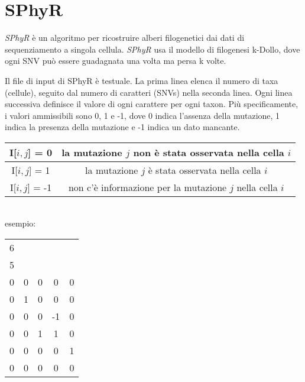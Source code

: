 \section{SPhyR}
\textit{SPhyR}\cite{sphyr} è un algoritmo per ricostruire alberi filogenetici dai dati di sequenziamento a singola cellula. \textit{SPhyR} usa il modello di filogenesi k-Dollo, dove ogni SNV può essere guadagnata una volta ma persa k volte.

Il file di input di SPhyR è testuale. La prima linea elenca il numero di taxa (cellule), seguito dal numero di caratteri (SNVs) nella seconda linea. Ogni linea successiva definisce il valore di ogni carattere per ogni taxon. Più specificamente, i valori ammissibili sono 0, 1 e -1, dove 0 indica l'assenza della mutazione, 1 indica la presenza della mutazione e -1 indica un dato mancante.
\begin{center}
\begin{tabular}{ | c | c | }
	\hline
	I[$i,j$] = 0 & la mutazione $j$ non è stata osservata nella cella $i$ \\
	\hline
	I[$i,j$] = 1 & la mutazione $j$ è stata osservata nella cella $i$ \\
	\hline
	I[$i,j$] = -1 & non c'è informazione per la mutazione $j$ nella cella $i$ \\
	\hline
\end{tabular}
\\
\smallskip
esempio:
\\
\smallskip
\begin{tabular}{  c c c c c }
	6 & & & &\\
	5 & & & & \\
	0 & 0 & 0 & 0 & 0 \\
	0 & 1 & 0 & 0 & 0 \\
	0 & 0 & 0 & -1 & 0 \\
	0 & 0 & 1 & 1 & 0 \\
	0 & 0 & 0 & 0 & 1 \\
	0 & 0 & 0 & 0 & 0 \\

\end{tabular}
\end{center}